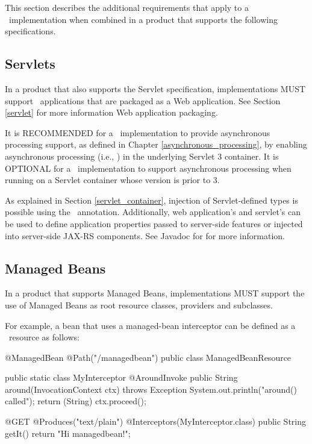 This section describes the additional requirements that apply to a \jaxrs\ implementation when combined in a product that supports the following specifications. 

\subsection{Servlets}
\label{servlets}

In a product that also supports the Servlet specification, implementations MUST support \jaxrs\ applications that are packaged as a Web application.
See Section \ref{servlet} for more information Web application packaging.

It is RECOMMENDED for a \jaxrs\ implementation to provide asynchronous processing support, as defined in Chapter \ref{asynchronous_processing}, by enabling asynchronous processing (i.e., ) in the underlying Servlet 3 container. It is OPTIONAL for a \jaxrs\ implementation to support asynchronous processing when running on a Servlet container whose version is prior to 3.

As explained in Section \ref{servlet_container}, injection of Servlet-defined types is possible using the \Context\ annotation. Additionally, web application's  and servlet's  can be used to define application properties passed to server-side features or injected into server-side JAX-RS components. See Javadoc for  for more information.

\subsection{Managed Beans}
\label{managed_beans}

In a product that supports Managed Beans, implementations MUST support the use of Managed Beans as root resource classes, providers and  subclasses. 

For example, a bean that uses a managed-bean interceptor can be defined as a \jaxrs\ resource as follows:

\begin{listing}{1}
@ManagedBean
@Path("/managedbean")
public class ManagedBeanResource {

    public static class MyInterceptor {
        @AroundInvoke
        public String around(InvocationContext ctx) throws Exception {
            System.out.println("around() called");
            return (String) ctx.proceed();
        }
    }

    @GET
    @Produces("text/plain")
    @Interceptors(MyInterceptor.class)
    public String getIt() {
        return "Hi managedbean!";
    }
}
\end{listing}

